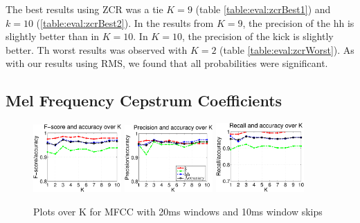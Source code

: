 		The best results using ZCR was a tie $K=9$ (table \ref{table:eval:zcrBest1}) and $k=10$ (\ref{table:eval:zcrBest2}). In the results from $K=9$, the precision of the hh is slightly better than in $K=10$. In $K=10$, the precision of the kick is slightly better.
		Th worst results was observed with $K=2$ (table \ref{table:eval:zcrWorst}). As with our results using RMS, we found that all probabilities were significant.
		
		
	\subsection{Mel Frequency Cepstrum Coefficients}
		\begin{figure}
			\centering\includegraphics[width=0.3\textwidth]{tex/appendices/test/mfcc2010FP.png}
			\centering\includegraphics[width=0.3\textwidth]{tex/appendices/test/mfcc2010_P.png}
			\centering\includegraphics[width=0.3\textwidth]{tex/appendices/test/mfcc2010_R.png}
			
			\caption{Plots over K for MFCC with 20ms windows and 10ms window skips}
		\end{figure}
